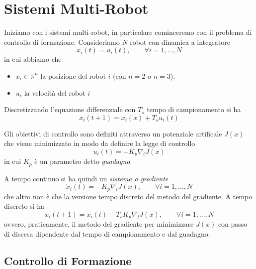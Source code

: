 \section{Sistemi Multi-Robot}

Iniziamo con i sistemi multi-robot, in particolare cominceremo con il problema di controllo di formazione. Consideriamo $N$ robot con dinamica a integratore
\begin{equation}
\dot{x}_i(t) = u_i(t), \qquad \forall i =1, \dots, N
\end{equation}
in cui abbiamo che 
\begin{itemize}
\item $x_i \in \mathbb{R}^n$ la posizione del robot $i$ (con $n=2$ o $n=3$).
\item $u_i$ la velocit\`a del robot $i$
\end{itemize}

Discretizzando l'equazione differenziale con $T_s$ tempo di campionamento si ha
\begin{equation}
x_i(t+1) = x_i(x) + T_s u_i(t)
\end{equation}

Gli obiettivi di controllo sono definiti attraverso un potenziale artificale $J(x)$ che viene minimizzato in modo da definire la legge di controllo
\begin{equation}
u_i(t) = -K_p \nabla_i J(x)
\end{equation}
in cui $K_p$ \`e un parametro detto \textit{guadagno}.

A tempo continuo si ha quindi un \textit{sistema a gradiente}
\begin{equation}
\dot{x}_i(t) = -K_p \nabla_i J(x), \qquad \forall i = 1, \dots, N
\end{equation}
che altro non \`e che la versione tempo discreto del metodo del gradiente.
A tempo discreto si ha
\begin{equation}
x_i(t+1) = x_i(t) - T_s K_p \nabla_i J(x), \qquad \forall i =1, \dots, N
\end{equation}
ovvero, praticamente, il metodo del gradiente per minimizzare $J(x)$ con passo di discesa dipendente dal tempo di campionamento e dal guadagno.

\subsection{Controllo di Formazione}

